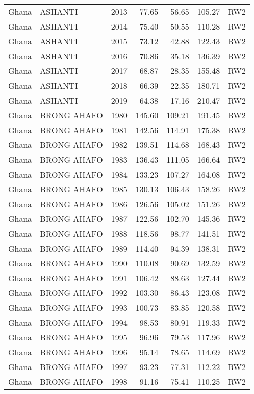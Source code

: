 \begin{longtable}{lllrrrl}
  Ghana & ASHANTI & 2013 & 77.65 & 56.65 & 105.27 & RW2 \\ 
  Ghana & ASHANTI & 2014 & 75.40 & 50.55 & 110.28 & RW2 \\ 
  Ghana & ASHANTI & 2015 & 73.12 & 42.88 & 122.43 & RW2 \\ 
  Ghana & ASHANTI & 2016 & 70.86 & 35.18 & 136.39 & RW2 \\ 
  Ghana & ASHANTI & 2017 & 68.87 & 28.35 & 155.48 & RW2 \\ 
  Ghana & ASHANTI & 2018 & 66.39 & 22.35 & 180.71 & RW2 \\ 
  Ghana & ASHANTI & 2019 & 64.38 & 17.16 & 210.47 & RW2 \\ 
  Ghana & BRONG AHAFO & 1980 & 145.60 & 109.21 & 191.45 & RW2 \\ 
  Ghana & BRONG AHAFO & 1981 & 142.56 & 114.91 & 175.38 & RW2 \\ 
  Ghana & BRONG AHAFO & 1982 & 139.51 & 114.68 & 168.43 & RW2 \\ 
  Ghana & BRONG AHAFO & 1983 & 136.43 & 111.05 & 166.64 & RW2 \\ 
  Ghana & BRONG AHAFO & 1984 & 133.23 & 107.27 & 164.08 & RW2 \\ 
  Ghana & BRONG AHAFO & 1985 & 130.13 & 106.43 & 158.26 & RW2 \\ 
  Ghana & BRONG AHAFO & 1986 & 126.56 & 105.02 & 151.26 & RW2 \\ 
  Ghana & BRONG AHAFO & 1987 & 122.56 & 102.70 & 145.36 & RW2 \\ 
  Ghana & BRONG AHAFO & 1988 & 118.56 & 98.77 & 141.51 & RW2 \\ 
  Ghana & BRONG AHAFO & 1989 & 114.40 & 94.39 & 138.31 & RW2 \\ 
  Ghana & BRONG AHAFO & 1990 & 110.08 & 90.69 & 132.59 & RW2 \\ 
  Ghana & BRONG AHAFO & 1991 & 106.42 & 88.63 & 127.44 & RW2 \\ 
  Ghana & BRONG AHAFO & 1992 & 103.30 & 86.43 & 123.08 & RW2 \\ 
  Ghana & BRONG AHAFO & 1993 & 100.73 & 83.85 & 120.58 & RW2 \\ 
  Ghana & BRONG AHAFO & 1994 & 98.53 & 80.91 & 119.33 & RW2 \\ 
  Ghana & BRONG AHAFO & 1995 & 96.96 & 79.53 & 117.96 & RW2 \\ 
  Ghana & BRONG AHAFO & 1996 & 95.14 & 78.65 & 114.69 & RW2 \\ 
  Ghana & BRONG AHAFO & 1997 & 93.23 & 77.31 & 112.22 & RW2 \\ 
  Ghana & BRONG AHAFO & 1998 & 91.16 & 75.41 & 110.25 & RW2 \\ 

\end{longtable}
